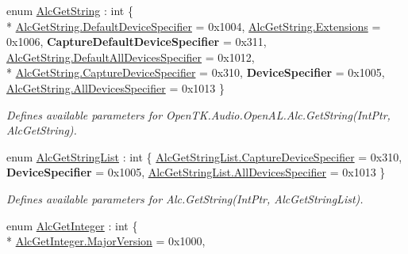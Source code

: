 \begin{DoxyCompactItemize}
enum \hyperlink{namespace_open_t_k_1_1_audio_1_1_open_a_l_a7ea538b81f9d8c91017cfd2f5794cd99}{Alc\-Get\-String} \-: int \{ \\*
\hyperlink{namespace_open_t_k_1_1_audio_1_1_open_a_l_a7ea538b81f9d8c91017cfd2f5794cd99aa6e3558426a5f45e54a81596ce865090}{Alc\-Get\-String.\-Default\-Device\-Specifier} = 0x1004, 
\hyperlink{namespace_open_t_k_1_1_audio_1_1_open_a_l_a7ea538b81f9d8c91017cfd2f5794cd99a5e2f5f3c24ae8c6ab3eca618826b0e23}{Alc\-Get\-String.\-Extensions} = 0x1006, 
{\bfseries Capture\-Default\-Device\-Specifier} = 0x311, 
\hyperlink{namespace_open_t_k_1_1_audio_1_1_open_a_l_a7ea538b81f9d8c91017cfd2f5794cd99a21a0eb7192dc5408c3d54d3bc14a4b70}{Alc\-Get\-String.\-Default\-All\-Devices\-Specifier} = 0x1012, 
\\*
\hyperlink{namespace_open_t_k_1_1_audio_1_1_open_a_l_a7ea538b81f9d8c91017cfd2f5794cd99a0a8ec01d72ee415be7826ca1e2ca5172}{Alc\-Get\-String.\-Capture\-Device\-Specifier} = 0x310, 
{\bfseries Device\-Specifier} = 0x1005, 
\hyperlink{namespace_open_t_k_1_1_audio_1_1_open_a_l_a7ea538b81f9d8c91017cfd2f5794cd99a2333af1d27e1bb583ce1b0b23609dac5}{Alc\-Get\-String.\-All\-Devices\-Specifier} = 0x1013
 \}
\begin{DoxyCompactList}\small\item\em Defines available parameters for Open\-T\-K.\-Audio.\-Open\-A\-L.\-Alc.\-Get\-String(\-Int\-Ptr, Alc\-Get\-String). \end{DoxyCompactList}\item 
enum \hyperlink{namespace_open_t_k_1_1_audio_1_1_open_a_l_ab48193b28204a15377a408d75aab408c}{Alc\-Get\-String\-List} \-: int \{ \hyperlink{namespace_open_t_k_1_1_audio_1_1_open_a_l_ab48193b28204a15377a408d75aab408ca0a8ec01d72ee415be7826ca1e2ca5172}{Alc\-Get\-String\-List.\-Capture\-Device\-Specifier} = 0x310, 
{\bfseries Device\-Specifier} = 0x1005, 
\hyperlink{namespace_open_t_k_1_1_audio_1_1_open_a_l_ab48193b28204a15377a408d75aab408ca2333af1d27e1bb583ce1b0b23609dac5}{Alc\-Get\-String\-List.\-All\-Devices\-Specifier} = 0x1013
 \}
\begin{DoxyCompactList}\small\item\em Defines available parameters for Alc.\-Get\-String(\-Int\-Ptr, Alc\-Get\-String\-List). \end{DoxyCompactList}\item 
enum \hyperlink{namespace_open_t_k_1_1_audio_1_1_open_a_l_ae26e71360702946aac46d8980c00d350}{Alc\-Get\-Integer} \-: int \{ \\*
\hyperlink{namespace_open_t_k_1_1_audio_1_1_open_a_l_ae26e71360702946aac46d8980c00d350af101b75fae84c9586538e47f7c67a7ca}{Alc\-Get\-Integer.\-Major\-Version} = 0x1000, 

\end{DoxyCompactItemize}
